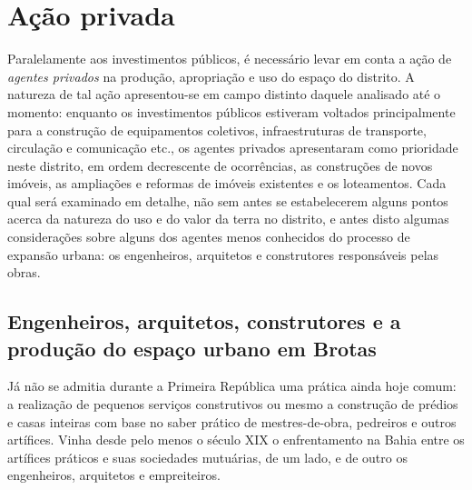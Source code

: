 \section{Ação privada}\label{sec:acaoprivada}

Paralelamente aos investimentos públicos, é necessário levar em conta a ação de \textit{agentes privados} na produção, apropriação e uso do espaço do distrito. A natureza de tal ação apresentou-se em campo distinto daquele analisado até o momento: enquanto os investimentos públicos estiveram voltados principalmente para a construção de equipamentos coletivos, infraestruturas de transporte, circulação e comunicação etc., os agentes privados apresentaram como prioridade neste distrito, em ordem decrescente de ocorrências, as construções de novos imóveis, as ampliações e reformas de imóveis existentes e os loteamentos. Cada qual será examinado em detalhe, não sem antes se estabelecerem alguns pontos acerca da natureza do uso e do valor da terra no distrito, e antes disto algumas considerações sobre alguns dos agentes menos conhecidos do processo de expansão urbana: os engenheiros, arquitetos e construtores responsáveis pelas obras.

\subsection{Engenheiros, arquitetos, construtores e a produção do espaço urbano em Brotas}\label{subsec:gestprodespbrotas}

Já não se admitia durante a Primeira República uma prática ainda hoje comum: a realização de pequenos serviços construtivos ou mesmo a construção de prédios e casas inteiras com base no saber prático de mestres-de-obra, pedreiros e outros artífices. Vinha desde pelo menos o século XIX o enfrentamento na Bahia entre os artífices práticos e suas sociedades mutuárias, de um lado, e de outro os engenheiros, arquitetos e empreiteiros. 

